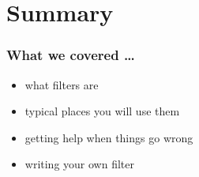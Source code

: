 \documentclass[pdf]{beamer}
\begin{document}
\section{Summary}

\begin{frame}
  \frametitle{What we covered \ldots}
  \pause{}
  \begin{itemize}[<+-|alert@+>]
    \item{what filters are}
    \item{typical places you will use them}
    \item{getting help when things go wrong}
    \item{writing your own filter}
  \end{itemize}
\end{frame}
\end{document}
